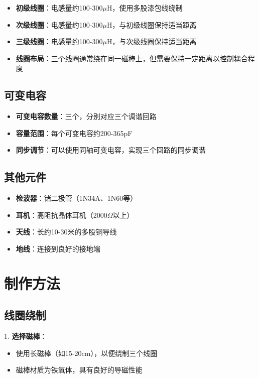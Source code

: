 \documentclass[12pt,UTF8]{ctexbook}
\begin{document}
\begin{itemize}[leftmargin=3.5em]
    \item \textbf{初级线圈}：电感量约100-300$\mu$H，使用多股漆包线绕制
    \item \textbf{次级线圈}：电感量约100-300$\mu$H，与初级线圈保持适当距离
    \item \textbf{三级线圈}：电感量约100-300$\mu$H，与次级线圈保持适当距离
    \item \textbf{线圈布局}：三个线圈通常绕在同一磁棒上，但需要保持一定距离以控制耦合程度
\end{itemize}

\subsection{可变电容}

\begin{itemize}[leftmargin=3.5em]
    \item \textbf{可变电容数量}：三个，分别对应三个调谐回路
    \item \textbf{容量范围}：每个可变电容约200-365pF
    \item \textbf{同步调节}：可以使用同轴可变电容，实现三个回路的同步调谐
\end{itemize}

\subsection{其他元件}

\begin{itemize}[leftmargin=3.5em]
    \item \textbf{检波器}：锗二极管（1N34A、1N60等）
    \item \textbf{耳机}：高阻抗晶体耳机（2000$\Omega$以上）
    \item \textbf{天线}：长约10-30米的多股铜导线
    \item \textbf{地线}：连接到良好的接地端
\end{itemize}

\section{制作方法}

\subsection{线圈绕制}

1. \textbf{选择磁棒}：
   \begin{itemize}[leftmargin=3.5em]
   \item 使用长磁棒（如15-20cm），以便绕制三个线圈
   \item 磁棒材质为铁氧体，具有良好的导磁性能
   \end{itemize}
\end{document}
